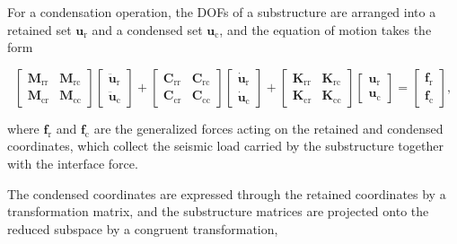 \documentclass[a4paper,fleqn,review,12pt]{cas-sc}
\numberwithin{equation}{section}
\begin{document}
For a condensation operation, the DOFs of a substructure are arranged into a retained set \(\bm{u}_{\mathrm{r}}\) and a condensed set \(\bm{u}_{\mathrm{c}}\), and the equation of motion takes the form

\begin{equation}
	\begin{bmatrix}
		\mathbf{M}_{\mathrm{rr}} & \mathbf{M}_{\mathrm{rc}}\\
		\mathbf{M}_{\mathrm{cr}} & \mathbf{M}_{\mathrm{cc}}
	\end{bmatrix}
	\begin{bmatrix}
		\ddot{\bm{u}}_{\mathrm{r}}\\
		\ddot{\bm{u}}_{\mathrm{c}}
	\end{bmatrix}
	+
	\begin{bmatrix}
		\mathbf{C}_{\mathrm{rr}} & \mathbf{C}_{\mathrm{rc}}\\
		\mathbf{C}_{\mathrm{cr}} & \mathbf{C}_{\mathrm{cc}}
	\end{bmatrix}
	\begin{bmatrix}
		\dot{\bm{u}}_{\mathrm{r}}\\
		\dot{\bm{u}}_{\mathrm{c}}
	\end{bmatrix}
	+
	\begin{bmatrix}
		\mathbf{K}_{\mathrm{rr}} & \mathbf{K}_{\mathrm{rc}}\\
		\mathbf{K}_{\mathrm{cr}} & \mathbf{K}_{\mathrm{cc}}
	\end{bmatrix}
	\begin{bmatrix}
		\bm{u}_{\mathrm{r}}\\
		\bm{u}_{\mathrm{c}}
	\end{bmatrix}
	=
	\begin{bmatrix}
		\bm{f}_{\mathrm{r}}\\
		\bm{f}_{\mathrm{c}}
	\end{bmatrix},
	\label{eq:partitioned-local-eom}
\end{equation}

\noindent where \(\bm{f}_{\mathrm{r}}\) and \(\bm{f}_{\mathrm{c}}\) are the generalized forces acting on the retained and condensed coordinates, which collect the seismic load carried by the substructure together with the interface force.

The condensed coordinates are expressed through the retained coordinates by a transformation matrix, and the substructure matrices are projected onto the reduced subspace by a congruent transformation,
\end{document}
